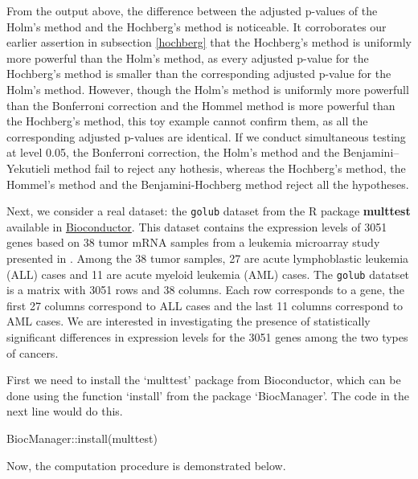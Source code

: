\documentclass[
]{book}
\newenvironment{Shaded}{\begin{snugshade}}{\end{snugshade}}
\newcommand{\FunctionTok}[1]{\textcolor[rgb]{0.00,0.00,0.00}{#1}}
\newcommand{\NormalTok}[1]{#1}
\newcommand{\SpecialCharTok}[1]{\textcolor[rgb]{0.00,0.00,0.00}{#1}}
\newcommand{\StringTok}[1]{\textcolor[rgb]{0.31,0.60,0.02}{#1}}
\begin{document}
From the output above, the difference between the adjusted p-values of the Holm's method and the Hochberg's method is noticeable. It corroborates our earlier assertion in subsection \ref{hochberg} that the Hochberg's method is uniformly more powerful than the Holm's method, as every adjusted p-value for the Hochberg's method is smaller than the corresponding adjusted p-value for the Holm's method. However, though the Holm's method is uniformly more powerfull than the Bonferroni correction and the Hommel method is more powerful than the Hochberg's method, this toy example cannot confirm them, as all the corresponding adjusted p-values are identical. If we conduct simultaneous testing at level 0.05, the Bonferroni correction, the Holm's method and the Benjamini--Yekutieli method fail to reject any hothesis, whereas the Hochberg's method, the Hommel's method and the Benjamini-Hochberg method reject all the hypotheses.

Next, we consider a real dataset: the \texttt{golub} dataset from the R package \textbf{multtest} available in \href{https://www.bioconductor.org/packages/release/bioc/html/multtest.html}{Bioconductor}. This dataset contains the expression levels of 3051 genes based on 38 tumor mRNA samples from a leukemia microarray study presented in \citet{golub1999molecular}. Among the 38 tumor samples, 27 are acute lymphoblastic leukemia (ALL) cases and 11 are acute myeloid leukemia (AML) cases. The \texttt{golub} datatset is a matrix with 3051 rows and 38 columns. Each row corresponds to a gene, the first 27 columns correspond to ALL cases and the last 11 columns correspond to AML cases. We are interested in investigating the presence of statistically significant differences in expression levels for the 3051 genes among the two types of cancers.

First we need to install the `multtest' package from Bioconductor, which can be done using the function `install' from the package `BiocManager'. The code in the next line would do this.

\begin{Shaded}
\begin{Highlighting}[]
\NormalTok{BiocManager}\SpecialCharTok{::}\FunctionTok{install}\NormalTok{(}\StringTok{\textquotesingle{}multtest\textquotesingle{}}\NormalTok{)}
\end{Highlighting}
\end{Shaded}

Now, the computation procedure is demonstrated below.
\end{document}
